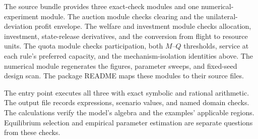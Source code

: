 The source bundle provides three exact-check modules and one numerical-experiment module. The auction module checks clearing and the unilateral-deviation profit envelope. The welfare and investment module checks allocation, investment, state-release derivatives, and the conversion from flight to resource units. The quota module checks participation, both $M$--$Q$ thresholds, service at each rule's preferred capacity, and the mechanism-isolation identities above. The numerical module regenerates the figures, parameter sweeps, and fixed-seed design scan. The package README maps these modules to their source files.

The entry point  executes all three with exact symbolic and rational arithmetic. The output file  records expressions, scenario values, and named domain checks. The calculations verify the model's algebra and the examples' applicable regions. Equilibrium selection and empirical parameter estimation are separate questions from these checks.
\FloatBarrier
